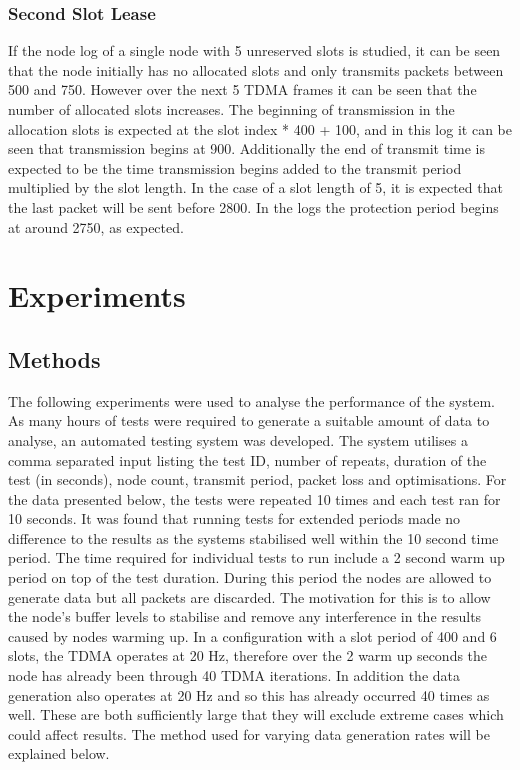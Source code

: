 \documentclass[parskip]{cs4rep}
\begin{document}
\subsection{Second Slot Lease}

If the node log of a single node with 5 unreserved slots is studied, it can be seen that the node initially has no allocated slots and only transmits packets between 500 and 750. However over the next 5 TDMA frames it can be seen that the number of allocated slots increases. The beginning of transmission in the allocation slots is expected at the slot index * 400 + 100, and in this log it can be seen that transmission begins at 900. Additionally the end of transmit time is expected to be the time transmission begins added to the transmit period multiplied by the slot length. In the case of a slot length of 5, it is expected that the last packet will be sent before 2800. In the logs the protection period begins at around 2750, as expected. 

\chapter{Experiments}

\section{Methods}

The following experiments were used to analyse the performance of the system. As many hours of tests were required to generate a suitable amount of data to analyse, an automated testing system was developed. The system utilises a comma separated input listing the test ID, number of repeats, duration of the test (in seconds), node count, transmit period, packet loss and optimisations. For the data presented below, the tests were repeated 10 times and each test ran for 10 seconds. It was found that running tests for extended periods made no difference to the results as the systems stabilised well within the 10 second time period. The time required for individual tests to run include a 2 second warm up period on top of the test duration. During this period the nodes are allowed to generate data but all packets are discarded. The motivation for this is to allow the node's buffer levels to stabilise and remove any interference in the results caused by nodes warming up. In a configuration with a slot period of 400 and 6 slots, the TDMA operates at 20 Hz, therefore over the 2 warm up seconds the node has already been through 40 TDMA iterations. In addition the data generation also operates at 20 Hz and so this has already occurred 40 times as well. These are both sufficiently large that they will exclude extreme cases which could affect results. The method used for varying data generation rates will be explained below.
\end{document}
